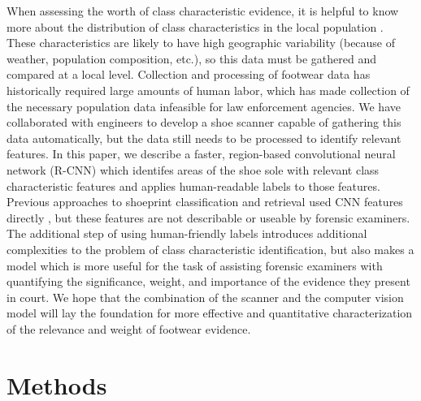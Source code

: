 \documentclass[10pt]{article}
\newcommand{\svp}[1]{{\textcolor{RedOrange}{#1}}}
\begin{document}

\svp{
When assessing the worth of class characteristic evidence, it is helpful to know more about the distribution of class characteristics in the local population \cite{grossVariabilitySignificanceClass2013}.
These characteristics are likely to have high geographic variability (because of weather, population composition, etc.), so this data must be gathered and compared at a local level.
Collection and processing of footwear data has historically required large amounts of human labor, which has made collection of the necessary population data infeasible for law enforcement agencies.
We have collaborated with engineers to develop a shoe scanner capable of gathering this data automatically, but the data still needs to be processed to identify relevant features.
In this paper, we describe a faster, region-based convolutional neural network (R-CNN) \cite{girshickFastRCNN2015} which identifes areas of the shoe sole with relevant class characteristic features and applies human-readable labels to those features.
Previous approaches to shoeprint classification and retrieval used CNN features directly \cite{zhangAdaptingConvolutionalNeural2017}, but these features are not describable or useable by forensic examiners.
The additional step of using human-friendly labels introduces additional complexities to the problem of class characteristic identification, but also makes a model which is more useful for the task of assisting forensic examiners with quantifying the significance, weight, and importance of the evidence they present in court.
We hope that the combination of the scanner and the computer vision model will lay the foundation for more effective and quantitative characterization of the relevance and weight of footwear evidence.}



\section{Methods}
\end{document}
